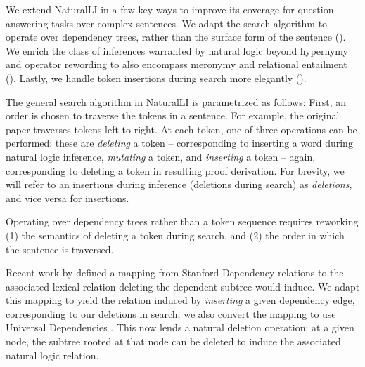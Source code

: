 We extend NaturalLI in a few key ways to improve its coverage for question
  answering tasks over complex sentences.
We adapt the search algorithm to operate over dependency
  trees, rather than the surface form of the sentence ().
We enrich the class of inferences warranted by natural logic beyond
  hypernymy and operator rewording to also encompass meronymy and
  relational entailment ().
Lastly, we handle token insertions during search more elegantly
  ().

The general search algorithm in NaturalLI is parametrized as follows:
First, an order is chosen to traverse the tokens in a sentence.
For example, the original paper traverses tokens left-to-right.
At each token, one of three operations can be performed:
  these are \textit{deleting} a token
  -- corresponding to inserting a word during natural logic inference,
  \textit{mutating} a token, and \textit{inserting} a token -- again, corresponding
  to deleting a token in resulting proof derivation.
For brevity, we will refer to an insertions during inference (deletions during
  search) as \textit{deletions}, and vice versa for insertions.

%
%
Operating over dependency trees rather than a token sequence requires reworking
  (1) the semantics of deleting a token during search, and 
  (2) the order in which the sentence is traversed.


Recent work by  defined a mapping from Stanford
  Dependency relations to the associated lexical relation deleting the
  dependent subtree would induce.
We adapt this mapping to yield the relation induced by \textit{inserting} a
  given dependency edge, corresponding to our deletions in search;
  we also convert the mapping to use Universal Dependencies
  \cite{key:stanford-ud}.
This now lends a natural deletion operation: at a given node, the subtree rooted
  at that node can be deleted to induce the associated natural logic relation.

